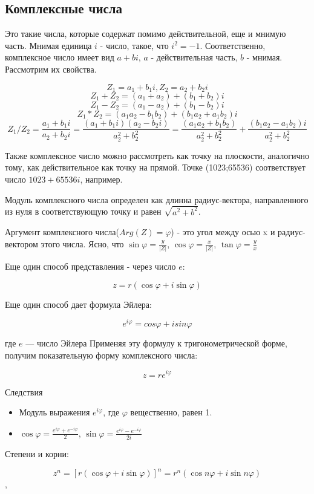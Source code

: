 \documentclass{article}
\begin{document}
\subsection*{Комплексные числа}
Это такие числа, которые содержат помимо действительной, еще и мнимую часть. Мнимая единица $i$ - число, такое, что $i^2=-1$. 
Соответственно, комплексное число имеет вид $a+bi$, $a$ - действительная часть, $b$ - мнимая.
Рассмотрим их свойства.

$$Z_1 = a_1 + b_1i, Z_2 = a_2 + b_2i$$
$$Z_1+Z_2 = (a_1+a_2) + (b_1+b_2)i$$
$$Z_1-Z_2 = (a_1-a_2) + (b_1-b_2)i$$
$$Z_1*Z_2 = (a_1a_2-b_1b_2) + (b_1a_2+a_1b_2)i$$
$$Z_1/Z_2 = \frac{a_1+b_1i}{a_2+b_2i} = \frac{(a_1+b_1i)(a_2-b_2i)}{a_2^2+b_2^2} = \frac{(a_1a_2+b_1b_2)}{a_2^2+b_2^2} + \frac{(b_1a_2-a_1b_2)i}{a_2^2+b_2^2}$$

Также комплексное число можно рассмотреть как точку на плоскости, аналогично тому, как действительное как точку на прямой. 
Точке (1023;65536) соответствует число $1023+65536 i $, например. 

Модуль комплексного числа определен как длинна радиус-вектора, направленного из нуля в соответствующую точку и равен $\sqrt{a^2 + b^2}$.

Аргумент комплексного числа($Arg(Z) = \varphi$) - это угол между осью x и радиус-вектором этого числа. 
Ясно, что $\sin \varphi = \frac y{|Z|}$, $\cos \varphi = \frac x{|Z|}$, $\tan \varphi = \frac yx$

Еще один способ представления - через число  $e$:

    $$z = r (\cos \varphi + i \sin \varphi )$$ 
    
Еще один способ дает формула Эйлера:

    $$e ^{i\varphi}= cos \varphi + i sin \varphi$$
    
где $e$ — число Эйлера
Применяя эту формулу к тригонометрической форме, получим показательную форму комплексного числа:

    $$z = r e ^{i \varphi}$$
   
Следствия
\begin{itemize}
    \item Модуль выражения $e^{i\varphi}$,  где $\varphi$ вещественно, равен 1.
    \item $ \cos \varphi =\frac {e^{i\varphi }+e^{-i\varphi }}{2}$, 
    $ \sin \varphi =\frac {e^{i\varphi }-e^{-i\varphi }}{2i}$
\end{itemize}

Степени и корни:

$$ z^{n}=\left[r\left(\cos \varphi +i\sin \varphi \right)\right]^{n}=r^{n}\left(\cos n\varphi +i\sin n\varphi \right)$$,
\end{document}
